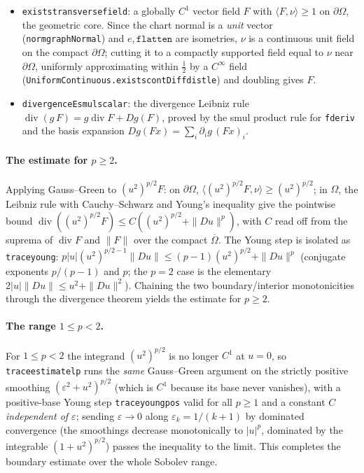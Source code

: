 ﻿\documentclass[12pt, a4paper]{article}
\renewcommand{\_}{\origunderscore\allowbreak}
\theoremstyle{definition}
\theoremstyle{plain}
\begin{document}
\begin{itemize}
  \item \texttt{exists\_transverse\_field}: a globally $C^1$ vector field $F$ with
    $\langle F,\nu\rangle\ge 1$ on $\partial\Omega$, the geometric core.  Since the chart normal is a
    \emph{unit} vector (\texttt{norm\_graphNormal}) and $e,\texttt{flatten}$ are isometries, $\nu$ is a
    continuous unit field on the compact $\partial\Omega$; cutting it to a compactly supported field
    equal to $\nu$ near $\partial\Omega$, uniformly approximating within $\tfrac12$ by a $C^\infty$
    field (\texttt{UniformContinuous.\allowbreak exists\_contDiff\_dist\_le}) and doubling gives $F$.
  \item \texttt{divergenceE\_smul\_scalar}: the divergence Leibniz rule
    $\operatorname{div}(g\,F)=g\operatorname{div}F+Dg(F)$, proved by the smul product rule for
    \texttt{fderiv} and the basis expansion $Dg(Fx)=\sum_i \partial_i g\,(Fx)_i$.
\end{itemize}

\paragraph{The estimate for $p\ge2$.}  Applying Gauss--Green to $(u^2)^{p/2}F$: on $\partial\Omega$,
$\langle (u^2)^{p/2} F,\nu\rangle\ge (u^2)^{p/2}$; in $\Omega$, the Leibniz rule with Cauchy--Schwarz
and Young's inequality give the pointwise bound
$\operatorname{div}((u^2)^{p/2} F)\le C((u^2)^{p/2}+\|Du\|^p)$, with $C$ read off from the suprema of
$\operatorname{div}F$ and $\|F\|$ over the compact $\overline\Omega$.  The Young step is isolated as
\texttt{trace\_young}: $p|u|(u^2)^{p/2-1}\|Du\|\le (p-1)(u^2)^{p/2}+\|Du\|^p$ (conjugate exponents
$p/(p-1)$ and $p$; the $p=2$ case is the elementary $2|u|\|Du\|\le u^2+\|Du\|^2$).  Chaining the two
boundary/interior monotonicities through the divergence theorem yields the estimate for $p\ge 2$.

\paragraph{The range $1\le p<2$.}  For $1\le p<2$ the integrand $(u^2)^{p/2}$ is no longer $C^1$ at $u=0$, so \texttt{trace\_estimate\_lp}
runs the \emph{same} Gauss--Green argument on the strictly positive smoothing $(\varepsilon^2+u^2)^{p/2}$
(which is $C^1$ because its base never vanishes), with a positive-base Young step
\texttt{trace\_young\_pos} valid for all $p\ge 1$ and a constant $C$ \emph{independent of
$\varepsilon$}; sending $\varepsilon\to0$ along $\varepsilon_k=1/(k+1)$ by dominated convergence
(the smoothings decrease monotonically to $|u|^p$, dominated by the integrable $(1+u^2)^{p/2}$) passes
the inequality to the limit.  This completes the boundary estimate over the whole Sobolev range.
\end{document}
